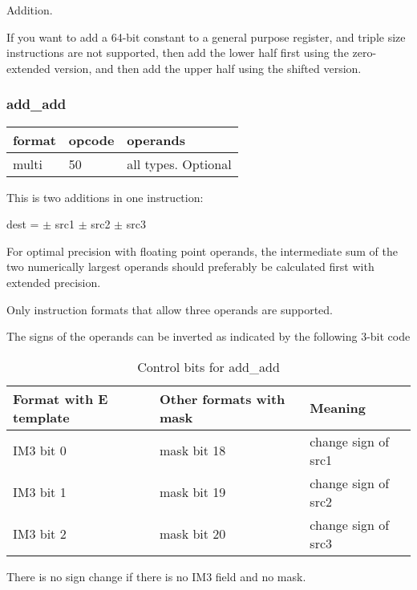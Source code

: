 \documentclass[forwardcom.tex]{subfiles}
\begin{document}
Addition.
\vspace{2mm}

If you want to add a 64-bit constant to a general purpose register, and triple size instructions are not supported, then add the lower half first using the zero-extended version, and then add the upper half using the shifted version.


\subsubsection{add\_add}
\label{table:addAddInstruction}
\begin{tabular}{|p{12mm}|p{12mm}|p{110mm}|}
\hline
\bfseries format & \bfseries opcode & \bfseries operands \\ \hline
multi & 50 & all types. Optional \\ \hline
\end{tabular}
\vspace{3mm}

This is two additions in one instruction:
\vspace{2mm}

dest = $\pm$ src1 $\pm$ src2 $\pm$ src3
\vspace{2mm}

For optimal precision with floating point operands, the intermediate sum of the two numerically largest operands should preferably be calculated first with extended precision.
\vspace{2mm}

Only instruction formats that allow three operands are supported.
\vspace{2mm}

The signs of the operands can be inverted as indicated by the following 3-bit code

\begin{longtable} {|p{20mm}|p{20mm}|p{75mm}|}
\caption{Control bits for add\_add} 
\label{table:ControlBitsForAddAdd} \\
\endfirsthead
\endhead
\hline
\bfseries Format with E template & \bfseries Other formats with mask & \bfseries Meaning   \\
\hline
IM3 bit 0 & mask bit 18 & change sign of src1 \\
IM3 bit 1 & mask bit 19 & change sign of src2 \\
IM3 bit 2 & mask bit 20 & change sign of src3 \\
\hline
\end{longtable}

There is no sign change if there is no IM3 field and no mask. 
\vspace{2mm}
\end{document}
